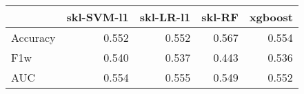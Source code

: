 \begin{tabular}{lrrrr}
\toprule
{} &  skl-SVM-l1 &  skl-LR-l1 &  skl-RF &  xgboost \\
\midrule
Accuracy &       0.552 &      0.552 &   0.567 &    0.554 \\
F1w      &       0.540 &      0.537 &   0.443 &    0.536 \\
AUC      &       0.554 &      0.555 &   0.549 &    0.552 \\
\bottomrule
\end{tabular}
